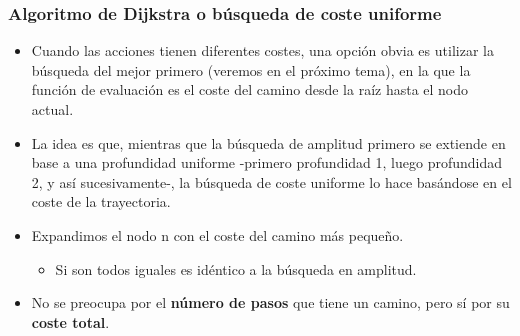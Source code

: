 \documentclass[xcolor=table]{beamer}
\begin{document}
\begin{frame} \frametitle{Algoritmo de Dijkstra o búsqueda de coste uniforme } \small
\begin{itemize}

\item Cuando las acciones tienen diferentes costes, una opción obvia es utilizar la búsqueda del mejor primero (veremos en el próximo tema), en la que la función de evaluación es el coste del camino desde la raíz hasta el nodo actual.

\item La idea es que, mientras que la búsqueda de amplitud primero se extiende en base a una profundidad uniforme -primero profundidad 1, luego profundidad 2, y así sucesivamente-, la búsqueda de coste uniforme lo hace basándose en el coste de la trayectoria.

\item Expandimos el nodo n con el coste del camino más pequeño.
	\begin{itemize}
		\item Si son todos iguales es idéntico a la búsqueda en amplitud.
	\end{itemize}
	
\item No se preocupa por el \textbf{número de pasos} que tiene un camino, pero sí por su \textbf{coste total}. 
	
	
\end{itemize}

\end{frame} 
\end{document}
